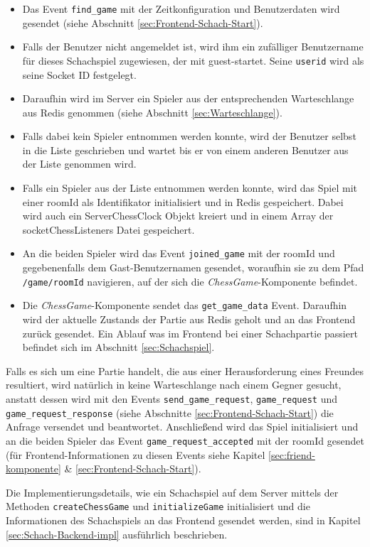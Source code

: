 \begin{itemize}
\item Das Event \verb|find_game| mit der Zeitkonfiguration und Benutzerdaten wird gesendet (siehe Abschnitt \ref{sec:Frontend-Schach-Start}).
\item Falls der Benutzer nicht angemeldet ist, wird ihm  ein zufälliger Benutzername für dieses Schachspiel zugewiesen, der mit \glqq guest-\grqq{ }startet. Seine \verb|userid| wird als seine Socket ID festgelegt.
\item Daraufhin wird im Server ein Spieler aus der entsprechenden Warteschlange aus Redis genommen (siehe Abschnitt \ref{sec:Warteschlange}).
\item Falls dabei kein Spieler entnommen werden konnte, wird der Benutzer selbst in die Liste geschrieben und wartet bis er von einem anderen Benutzer aus der Liste genommen wird.
\item Falls ein Spieler aus der Liste entnommen werden konnte, wird das Spiel mit einer roomId als Identifikator initialisiert und in Redis gespeichert. Dabei wird auch ein ServerChessClock Objekt kreiert und in einem Array der socketChessListeners Datei gespeichert.
\item An die beiden Spieler wird das Event \verb|joined_game| mit der roomId und gegebenenfalls dem Gast-Benutzernamen gesendet, woraufhin sie zu dem Pfad \verb|/game/roomId| navigieren, auf der sich die \textit{ChessGame}-Komponente befindet.
\item Die \textit{ChessGame}-Komponente sendet das \verb|get_game_data| Event. Daraufhin wird der aktuelle Zustands der Partie aus Redis geholt und an das Frontend zurück gesendet. Ein Ablauf was im Frontend bei einer Schachpartie passiert befindet sich im Abschnitt \ref{sec:Schachspiel}.
\end{itemize}

Falls es sich um eine Partie handelt, die aus einer Herausforderung eines Freundes resultiert, wird natürlich in keine Warteschlange nach einem Gegner gesucht, anstatt dessen wird mit den Events \verb|send_game_request|, \verb|game_request| und \verb|game_request_response| (siehe Abschnitte \ref{sec:Frontend-Schach-Start}) die Anfrage versendet und beantwortet. Anschließend wird das Spiel initialisiert und an die beiden Spieler das Event \verb|game_request_accepted| mit der roomId gesendet (für Frontend-Informationen zu diesen Events siehe Kapitel \ref{sec:friend-komponente} \& \ref{sec:Frontend-Schach-Start}).

Die Implementierungsdetails, wie ein Schachspiel auf dem Server mittels der Methoden \verb|createChessGame| und \verb|initializeGame| initialisiert und die Informationen des Schachspiels an das Frontend gesendet werden, sind in Kapitel \ref{sec:Schach-Backend-impl} ausführlich beschrieben.

